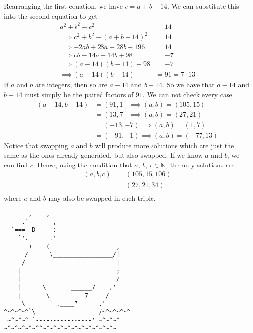 \documentclass{article}
\begin{document}
\begin{enumerate}[1.]
Rearranging the first equation, we have $c = a + b - 14$. We can substitute this into the second equation to get 
\begin{align*}
  a^2 + b^2 - c^2 &= 14 \\
  \implies a^2 + b^2 - (a + b - 14)^2 &= 14 \\
  \implies -2ab + 28a + 28b - 196 &= 14 \\
  \implies ab - 14a - 14 b + 98 &= -7 \\
  \implies (a - 14)(b - 14) - 98 &= -7 \\
  \implies (a - 14)(b - 14) &= 91 = 7 \cdot 13
\end{align*}
If $a$ and $b$ are integers, then so are $a - 14$ and $b - 14$. So we have that $a - 14$ and $b - 14$ must simply be the paired factors of $91$. We can not check every case 
\begin{align*}
  (a - 14, b - 14) &= (91, 1) \implies (a, b) = (105, 15) \\
  &= (13, 7) \implies (a, b) = (27, 21) \\
  &= (-13, -7) \implies (a, b) = (1, 7) \\
  &= (-91, -1) \implies (a, b) = (-77, 13)
\end{align*}
Notice that swapping $a$ and $b$ will produce more solutions which are just the same as the ones already generated, but also swapped. If we know $a$ and $b$, we can find $c$. Hence, using the condition that $a$, $b$, $c \in \mathbb{N}$, the only solutions are
\begin{align*}
  (a, b, c) &= (105, 15, 106) \\
  &= (27, 21, 34) \\
\end{align*}
where $a$ and $b$ may also be swapped in each triple.

\end{enumerate}

\vfill
\centering
\tiny
\begin{BVerbatim}
       ,----,
  ___.`      `,
  `===  D     :
    `'.      .'
       )    (                   ,
      /      \_________________/|
     /                          |
    |                           ;
    |               _____       /
    |      \       ______7    ,'
    |       \    ______7     /
     \       `-,____7      ,'   
^~^~^~^`\                  /~^~^~^~^
 ~^~^~^ `----------------' ~^~^~^
~^~^~^~^~^^~^~^~^~^~^~^~^~^~^~^~
\end{BVerbatim}
\end{document}
